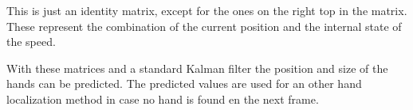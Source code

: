 This is just an identity matrix, except for the ones on the right top in the matrix. These represent the combination of the current position and the internal state of the speed.

With these matrices and a standard Kalman filter the position and size of the hands can be predicted. The predicted values are used for an other hand localization method in case no hand is found en the next frame.




% 










